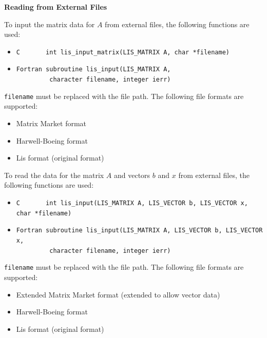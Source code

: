 \documentclass[a4paper]{article}
\begin{document}
\noindent
{\bf Reading from External Files}

To input the matrix data for $A$ from external files,
the following functions are used:
\begin{itemize}
\item \verb|C       int lis_input_matrix(LIS_MATRIX A, char *filename)|
\item \verb|Fortran subroutine lis_input(LIS_MATRIX A,|\\
      \verb|         character filename, integer ierr)|
\end{itemize}
{\tt filename} must be replaced with the file path.
The following file formats are supported:

\begin{itemize}
\item Matrix Market format
\item Harwell-Boeing format
\item Lis format (original format)
\end{itemize}

To read the data for the matrix $A$ and vectors $b$ and $x$ from
external files, the following functions are used:
\begin{itemize}
\item \verb|C       int lis_input(LIS_MATRIX A, LIS_VECTOR b, LIS_VECTOR x, char *filename)|
\item \verb|Fortran subroutine lis_input(LIS_MATRIX A, LIS_VECTOR b, LIS_VECTOR x,|\\
      \verb|         character filename, integer ierr)|
\end{itemize}
{\tt filename} must be replaced with the file path.
The following file formats are supported:

\begin{itemize}
\item Extended Matrix Market format (extended to allow vector data)
\item Harwell-Boeing format
\item Lis format (original format)
\end{itemize}
\end{document}
